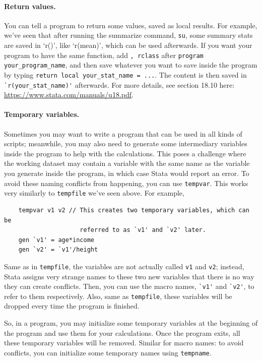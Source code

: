 \paragraph{Return values.} You can tell a program to return some values, saved as local results. For example, we've seen that after running the summarize command, \verb|su|, some summary stats are saved in `r()', like `r(mean)', which can be used afterwards. If you want your program to have the same function, add \verb|, rclass| after \verb|program your_program_name|, and then save whatever you want to save inside the program by typing \verb|return local your_stat_name = ...|. The content is then saved in \verb|`r(your_stat_name)'| afterwards. For more details, see section 18.10 here: \url{https://www.stata.com/manuals/u18.pdf}.

\paragraph{Temporary variables.} Sometimes you may want to write a program that can be used in all kinds of scripts; meanwhile, you may also need to generate some intermediary variables inside the program to help with the calculations. This poses a challenge where the working dataset may contain a variable with the same name as the variable you generate inside the program, in which case Stata would report an error. To avoid these naming conflicts from happening, you can use \verb|tempvar|. This works very similarly to \verb|tempfile| we've seen above. For example, 
\begin{verbatim}
    tempvar v1 v2 // This creates two temporary variables, which can be
                     referred to as `v1' and `v2' later.
    gen `v1' = age*income
    gen `v2' = `v1'/height
\end{verbatim}
Same as in \verb|tempfile|, the variables are not actually called \verb|v1| and \verb|v2|; instead, Stata assigns very strange names to these two new variables that there is no way they can create conflicts. Then, you can use the macro names, \verb|`v1'| and \verb|`v2'|, to refer to them respectively. Also, same as \verb|tempfile|, these variables will be dropped every time the program is finished. 

So, in a program, you may initialize some temporary variables at the beginning of the program and use them for your calculations. Once the program exits, all these temporary variables will be removed. Similar for macro names: to avoid conflicts, you can initialize some temporary names using \verb|tempname|. 

